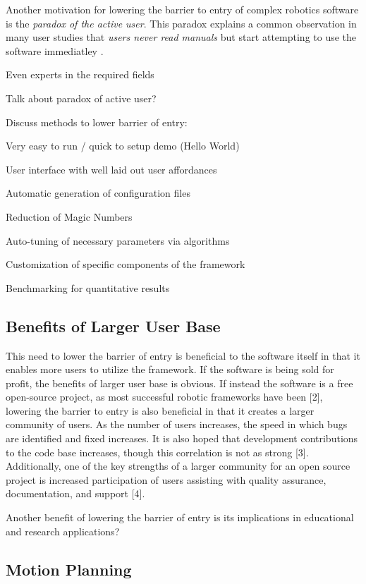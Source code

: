 \documentclass[10pt,journal,compsoc]{joser1}
\begin{document}
{Another motivation for lowering the barrier to entry of complex robotics software is the \textit{paradox of the active user}. This paradox explains a common observation in many user studies that \textit{users never read manuals} but start attempting to use the software immediatley \cite{carroll1987interfacing}.

Even experts in the required fields 

Talk about paradox of active user?

Discuss methods to lower barrier of entry:

Very easy to run / quick to setup demo (Hello World)

User interface with well laid out user affordances

Automatic generation of configuration files

Reduction of Magic Numbers

Auto-tuning of necessary parameters via algorithms

Customization of specific components of the framework

Benchmarking for quantitative results

\subsection{Benefits of Larger User Base}

This need to lower the barrier of entry is beneficial to the software itself in that it enables more users to utilize the framework. If the software is being sold for profit, the benefits of larger user base is obvious. If instead the software is a free open-source project, as most successful robotic frameworks have been [2], lowering the barrier to entry is also beneficial in that it creates a larger community of users. As the number of users increases, the speed in which bugs are identified and fixed increases. It is also hoped that development contributions to the code base increases, though this correlation is not as strong [3]. Additionally, one of the key strengths of a larger community for an open source project is increased participation of users assisting with quality assurance, documentation, and support [4].

Another benefit of lowering the barrier of entry is its implications in educational and research applications?

\subsection{Motion Planning}

}
\end{document}
